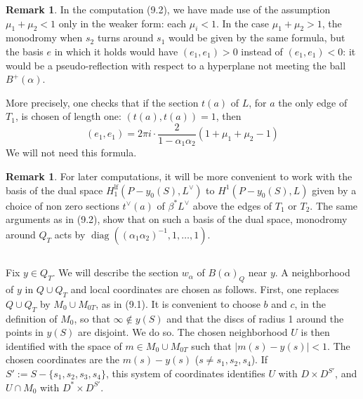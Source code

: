 \documentclass[12pt,a4paper]{article}
\theoremstyle{plain}
\theoremstyle{definition}
\newtheorem{remark}[theorem]{Remark}
\theoremstyle{remark}
\DeclareMathOperator{\diag}{diag}
\numberwithin{equation}{section}
\begin{document}
\begin{remark}\label{rmk:9.3}
In the computation (9.2), we have made use of the assumption $\mu_1 + \mu_2 < 1$ only in the weaker form: each $\mu_i < 1$. In the case $\mu_1 + \mu_2 > 1$, the monodromy when $s_2$ turns around $s_1$ would be given by the same formula, but the basis $e$ in which it holds would have $(e_1, e_1) > 0$ instead of $(e_1, e_1) < 0$: it would be a pseudo-reflection with respect to a hyperplane not meeting the ball $B^+(\alpha)$.

More precisely, one checks that if the section $t(a)$ of $L$, for $a$ the only edge of $T_1$, is chosen of length one: $(t(a), t(a)) = 1$, then
\[
(e_1, e_1) = 2\pi i \cdot \frac{2}{1 - \alpha_1 \alpha_2} (1 + \mu_1 + \mu_2 - 1)
\]
We will not need this formula.
\end{remark}

\begin{remark}\label{rmk:9.4}
For later computations, it will be more convenient to work with the basis of the dual space $H^{\mathrm{lf}}_1(P - y_0(S), L^\vee)$ to $H^1(P - y_0(S), L)$ given by a choice of non zero sections $t^\vee(a)$ of $\beta^*L^\vee$ above the edges of $T_1$ or $T_2$. The same arguments as in (9.2), show that on such a basis of the dual space, monodromy around $Q_T$ acts by $\diag((\alpha_1 \alpha_2)^{-1}, 1, \ldots, 1)$.
\end{remark}

\subsection{}
Fix $y \in Q_T$. We will describe the section $w_\alpha$ of $B(\alpha)_Q$ near $y$. A neighborhood of $y$ in $Q \cup Q_T$ and local coordinates are chosen as follows. First, one replaces $Q \cup Q_T$ by $M_0 \cup M_{0T}$, as in (9.1). It is convenient to choose $b$ and $c$, in the definition of $M_0$, so that $\infty \notin y(S)$ and that the discs of radius 1 around the points in $y(S)$ are disjoint. We do so. The chosen neighborhood $U$ is then identified with the space of $m \in M_0 \cup M_{0T}$ such that $|m(s) - y(s)| < 1$. The chosen coordinates are the $m(s) - y(s)$ ($s \neq s_1, s_2, s_4$). If $S' := S - \{s_1, s_2, s_3, s_4\}$, this system of coordinates identifies $U$ with $D \times D^{S'}$, and $U \cap M_0$ with $D^* \times D^{S'}$.
\end{document}
